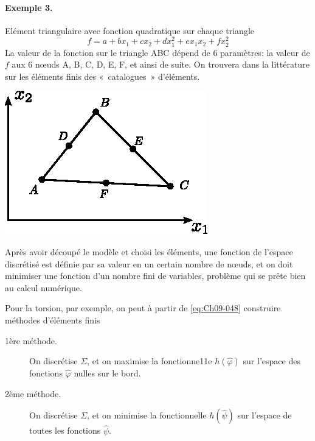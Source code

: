 \paragraph{Exemple 3.}
\begin{multicols}{2}
Elément triangulaire avec fonction quadratique sur chaque triangle 
\begin{equation}
    f = a + b x_1 + c x_2 + d x_1^2 + e x_1 x_2 +f x_2^2
    \label{eq:Ch09-066}
\end{equation}
La valeur de la fonction sur le triangle ABC dépend de 6 paramètres: la valeur de $f$ aux 6 nœuds A, B, C, D, E, F, et ainsi de suite.
On trouvera dans la littérature sur les éléments finis des «~catalogues~» d'éléments. 
\columnbreak
\begin{center}
    \includegraphics{../images/T1_Ch09-04}
\end{center}
\end{multicols}
Après avoir découpé le modèle et choisi les éléments, une fonction de l'espace discrétisé est définie par sa valeur en un certain nombre de nœuds, et on doit minimiser une fonction d'un nombre fini de variables, problème qui se prête bien au calcul numérique. 

Pour la torsion, par exemple, on peut à partir de \eqref{eq:Ch09-048} construire méthodes d'éléments finis
\begin{description}
    \item[1ère méthode.] On discrétise $\Sigma$, et on maximise la fonctionne11e $h(\hat{\varphi})$ sur l'espace des fonctions $\hat{\varphi}$ nulles sur le bord. 
    \item[2ème méthode.] On discrétise $\Sigma$, et on minimise la fonctionnelle $h(\hat{\psi})$ sur l'espace de toutes les fonctions $\hat{\psi}$.
\end{description}

